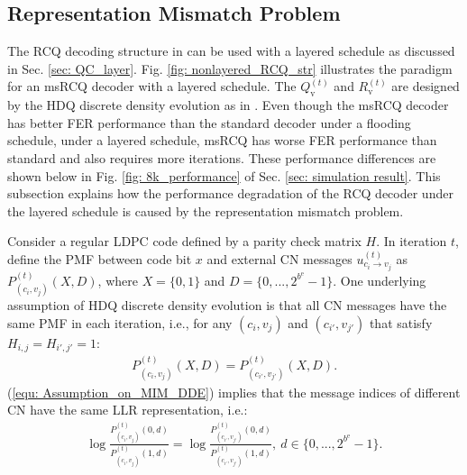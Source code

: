 \documentclass [PhD] {uclathes}
\begin{document}
\subsection{Representation Mismatch Problem}
The RCQ decoding structure in \cite{Wang2020-RCQ} can be used with a layered schedule as discussed in Sec. \ref{sec: QC_layer}. Fig. \ref{fig: nonlayered_RCQ_str} illustrates the paradigm for an msRCQ decoder with a layered schedule. The $Q_\text{v}^{(t)}$ and $R_\text{v}^{(t)}$ are designed by the HDQ discrete density evolution as in \cite{Wang2020-RCQ}. Even though the msRCQ decoder has better FER performance than the standard \minsum decoder under a flooding schedule\cite{Wang2020-RCQ}, under a layered schedule, msRCQ has worse FER performance than standard \minsum and also requires more iterations.  These performance differences are shown below in Fig.  \ref{fig: 8k_performance} of Sec. \ref{sec: simulation result}. This subsection explains how the performance degradation of the RCQ decoder under the layered schedule is caused by the representation mismatch problem. 


Consider a  regular LDPC code defined by a parity check matrix $H$. In iteration $t$, define the PMF between code bit $x$ and external CN messages $u^{(t)}_{c_i \rightarrow v_j}$ as $P^{(t)}_{(c_i,v_j)}(X,D)$, where $X=\{0,1\}$ and $D=\{0,...,2^{b^\mathrm{e}}-1\}$. One underlying assumption of HDQ discrete density evolution is that all CN messages have the same PMF in each iteration, i.e., for any $(c_{i},v_{j})$ and $(c_{i'}, v_{j'})$ that satisfy $H_{i,j}=H_{i',j'}=1$:
\begin{align}
    P^{(t)}_{(c_i,v_j)}(X,D) = P^{(t)}_{(c_{i'},v_{j'})}(X,D).
    \label{equ: Assumption_on_MIM_DDE}
\end{align}
(\ref{equ: Assumption_on_MIM_DDE}) implies that the message indices of different CN have the same LLR representation, i.e.:
\begin{align}
    \log\frac{P^{(t)}_{(c_i,v_j)}(0,d)}{P^{(t)}_{(c_i,v_j)}(1,d)} = \log\frac{P^{(t)}_{(c_{i'},v_{j'})}(0,d)}{P^{(t)}_{(c_{i'},v_{j'})}(1,d)},~   d\in \{0,...,2^{b^\mathrm{e}}-1\}.
    \label{equ: Assumption_on_MIM_DDE2}
\end{align}
\end{document}
